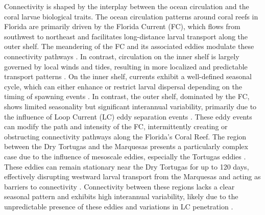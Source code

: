 \documentclass[preprint,12pt,authoryear]{elsarticle}
\begin{document}
	Connectivity is shaped by the interplay between the ocean circulation and the coral larvae biological traits. The ocean circulation patterns around coral reefs in Florida are primarily driven by the Florida Current (FC), which flows from southwest to northeast and facilitates long-distance larval transport along the outer shelf. The meandering of the FC and its associated eddies modulate these connectivity pathways \citep{lee1994evolution,kourafalou2012florida}. In contrast, circulation on the inner shelf is largely governed by local winds and tides, resulting in more localized and predictable transport patterns \citep{lee2002volume,liu2012seasonal}. On the inner shelf, currents exhibit a well-defined seasonal cycle, which can either enhance or restrict larval dispersal depending on the timing of spawning events \citep{liu2012seasonal}. In contrast, the outer shelf, dominated by the FC, shows limited seasonality but significant interannual variability, primarily due to the influence of Loop Current (LC) eddy separation events \citep{kourafalou2012florida}. These eddy events can modify the path and intensity of the FC, intermittently creating or obstructing connectivity pathways along the Florida's Coral Reef. The region between the Dry Tortugas and the Marquesas presents a particularly complex case due to the influence of mesoscale eddies, especially the Tortugas eddies \citep{dobbelaere2022connecting}. These eddies can remain stationary near the Dry Tortugas for up to 120 days, effectively disrupting westward larval transport from the Marquesas and acting as barriers to connectivity \citep{fratantoni1998influence,kourafalou2012florida}. Connectivity between these regions lacks a clear seasonal pattern and exhibits high interannual variability, likely due to the unpredictable presence of these eddies and variations in LC penetration \citep{lee1994evolution}.
	
\end{document}
